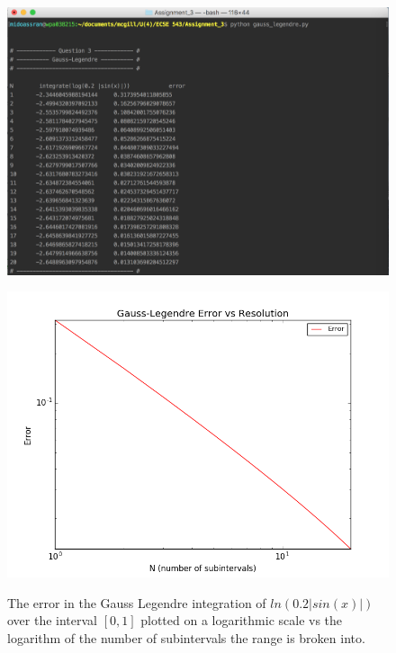 \documentclass[11pt]{article}
\begin{document}
\begin{figure}[!hbp]
	\begin{center}
		\begin{minipage}{ 0.7\textwidth}
			\includegraphics[width= \textwidth]{o_GL_log_sin.png}\\
		\end{minipage}
		\begin{minipage}{ \textwidth}
			\includegraphics[width=\textwidth]{GL_log_sin}\\
		\end{minipage}
		\caption{\label{fig:GL_log_sin}The error in the Gauss Legendre integration of $ln(0.2 |sin(x)|)$ over the interval $[0,1]$ plotted on a logarithmic scale vs the logarithm of the number of subintervals the range is broken into.}
	\end{center}
\end{figure}
\end{document}
